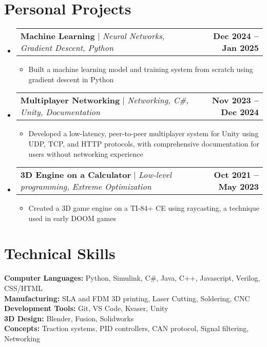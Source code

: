 \documentclass[letterpaper,11pt]{article}
\makeatletter
\newcommand{\resumeItem}[1]{
  \item\normalsize{
    {#1 \vspace{-2pt}}
  }
}
\newcommand{\resumeProjectHeading}[2]{
    \item
    \begin{tabular*}{1.001\textwidth}{l@{\extracolsep{\fill}}r}
      \normalsize#1 & \textbf{\normalsize #2}\\
    \end{tabular*}\vspace{-7pt}
}
\newcommand{\resumeSubHeadingListStart}{\begin{itemize}[leftmargin=0.0in, label={}]}
\newcommand{\resumeSubHeadingListEnd}{\end{itemize}}
\newcommand{\resumeItemListStart}{\begin{itemize}}
\newcommand{\resumeItemListEnd}{\end{itemize}\vspace{-5pt}}
\makeatother
\begin{document}
\section{Personal Projects}
    \vspace{-5pt}
    \resumeSubHeadingListStart
      \resumeProjectHeading
          {\textbf{Machine Learning} $|$ \emph{Neural Networks, Gradient Descent, Python}}{Dec 2024 -- Jan 2025}
          \resumeItemListStart 
            \resumeItem{Built a machine learning model and training system from scratch using gradient descent in Python}
          \resumeItemListEnd
          \vspace{-16pt}
      \resumeProjectHeading
          {\textbf{Multiplayer Networking} $|$ \emph{Networking, C\#, Unity, Documentation}}{Nov 2023 -- Dec 2024}
          \resumeItemListStart
            \resumeItem{Developed a low-latency, peer-to-peer multiplayer system for Unity using UDP, TCP, and HTTP protocols, with comprehensive documentation for users without networking experience}
          \resumeItemListEnd
          \vspace{-16pt}
      \resumeProjectHeading
          {\textbf{3D Engine on a Calculator} $|$ \emph{Low-level programming, Extreme Optimization}}{Oct 2021 -- May 2023}
          \resumeItemListStart
            \resumeItem{Created a 3D game engine on a TI-84+ CE using raycasting, a technique used in early DOOM games}
          \resumeItemListEnd
          \vspace{-16pt}
    \resumeSubHeadingListEnd
\vspace{5pt} 


\section{Technical Skills}
 \begin{itemize}[leftmargin=0.15in, label={}]
    \normalsize{\item{
     \textbf{Computer Languages:}{ Python, Simulink, C\#, Java, C++, Javascript, Verilog, CSS/HTML} \\
     \textbf{Manufacturing:}{ SLA and FDM 3D printing, Laser Cutting, Soldering, CNC} \\
     \textbf{Development Tools:}{ Git, VS Code, Kvaser, Unity} \\
     \textbf{3D Design:}{ Blender, Fusion, Solidworks} \\
     \textbf{Concepts:}{ Traction systems, PID controllers, CAN protocol, Signal filtering, Networking} }}
 \end{itemize}
 \vspace{-16pt} 
\end{document}
